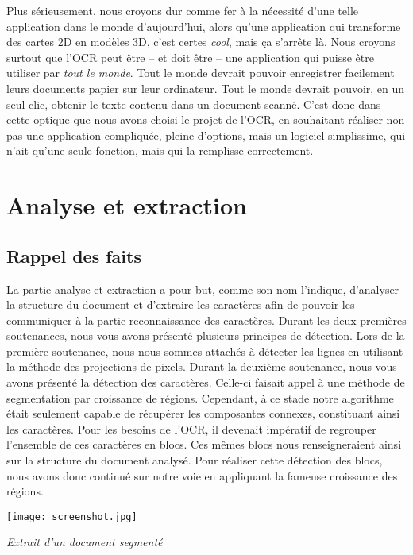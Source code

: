 \documentclass[a4paper,10pt]{report}
\begin{document}
Plus sérieusement, nous croyons dur comme fer à la nécessité d’une telle application dans le monde d’aujourd’hui, alors qu’une application qui transforme des cartes 2D en modèles 3D, c’est certes \emph{cool}, mais ça s’arrête là. Nous croyons surtout que l’OCR peut être – et doit être – une application qui puisse être utiliser par \emph{tout le monde}. Tout le monde devrait pouvoir enregistrer facilement leurs documents papier sur leur ordinateur. Tout le monde devrait pouvoir, en un seul clic, obtenir le texte contenu dans un document scanné. C’est donc dans cette optique que nous avons choisi le projet de l’OCR, en souhaitant réaliser non pas une application compliquée, pleine d’options, mais un logiciel simplissime, qui n’ait qu’une seule fonction, mais qui la remplisse correctement.

\chapter{Analyse et extraction}

\section{Rappel des faits}

La partie analyse et extraction a pour but, comme son nom l'indique, d'analyser la
structure du document et d'extraire les caractères afin de pouvoir les communiquer à la
partie reconnaissance des caractères. Durant les deux premières soutenances, nous vous
avons présenté plusieurs principes de détection. Lors de la première soutenance, nous nous
sommes attachés à détecter les lignes en utilisant la méthode des projections de pixels.
Durant la deuxième soutenance, nous vous avons présenté la détection des
caractères. Celle-ci faisait appel à une méthode de segmentation par croissance de régions.
Cependant, à ce stade notre algorithme était seulement capable de récupérer les
composantes connexes, constituant ainsi les caractères. Pour les besoins de l'OCR, il
devenait impératif de regrouper l'ensemble de ces caractères en blocs. Ces mêmes blocs
nous renseigneraient ainsi sur la structure du document analysé. Pour réaliser cette
détection des blocs, nous avons donc continué sur notre voie en appliquant la fameuse
croissance des régions.

\begin{center}
  \texttt{[image: screenshot.jpg]}
  \caption{\emph{Extrait d'un document segment\'e}}
\end{center}
\end{document}
